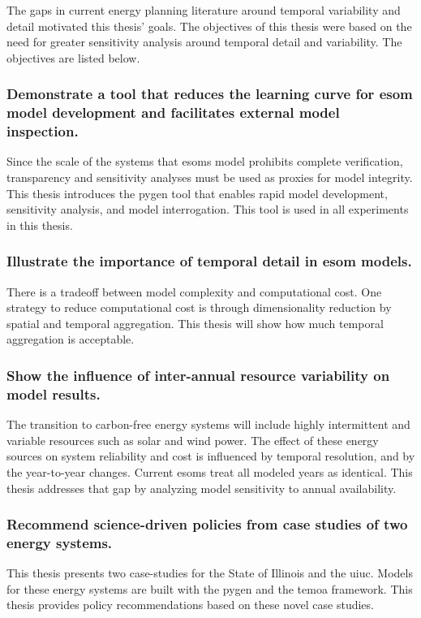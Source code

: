 The gaps in current energy planning literature around temporal variability and
detail motivated this thesis' goals.
The objectives of this thesis were based on the need for greater sensitivity
analysis around temporal detail and variability. The objectives are listed below.

\subsubsection{Demonstrate a tool that reduces the learning curve for \gls{esom}
model development and facilitates external model inspection.} Since the scale
of the systems that \glspl{esom} model prohibits complete verification, transparency
and sensitivity analyses must be used as proxies for model integrity. This thesis
introduces the \gls{pygen} tool that enables rapid model development, sensitivity
analysis, and model interrogation. This tool is used in all experiments in this
thesis.

\subsubsection{Illustrate the importance of temporal detail in \gls{esom} models.}
There is a tradeoff between model complexity and computational cost. One strategy
to reduce computational cost is through dimensionality reduction by spatial
and temporal aggregation. This thesis will show how much temporal aggregation is
acceptable.

\subsubsection{Show the influence of inter-annual resource variability on model
results.} The transition to carbon-free energy systems will include highly intermittent
and variable resources such as solar and wind power. The effect of these energy
sources on system reliability and cost is influenced by temporal resolution, and
by the year-to-year changes. Current \glspl{esom} treat all modeled years
as identical. This thesis addresses that gap by analyzing model sensitivity to
annual availability.

\subsubsection{Recommend science-driven policies from case studies of two energy systems.}
This thesis presents two case-studies for the State of Illinois and the \gls{uiuc}.
Models for these energy systems are built with the \gls{pygen} and the \gls{temoa}
framework. This thesis provides policy recommendations based on these novel case
studies.
